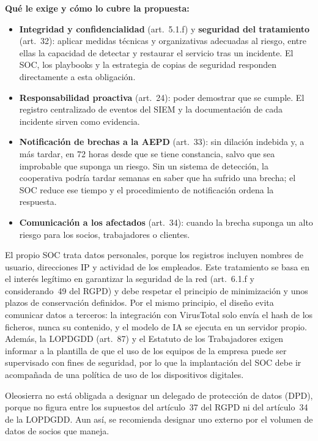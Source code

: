 \documentclass[11pt,a4paper,oneside]{report}
\begin{document}
\textbf{Qué le exige y cómo lo cubre la propuesta:}
\begin{itemize}
  \item \textbf{Integridad y confidencialidad} (art.~5.1.f) y \textbf{seguridad del tratamiento} (art.~32): aplicar medidas técnicas y organizativas adecuadas al riesgo, entre ellas la capacidad de detectar y restaurar el servicio tras un incidente. El SOC, los playbooks y la estrategia de copias de seguridad responden directamente a esta obligación.
  \item \textbf{Responsabilidad proactiva} (art.~24): poder demostrar que se cumple. El registro centralizado de eventos del SIEM y la documentación de cada incidente sirven como evidencia.
  \item \textbf{Notificación de brechas a la AEPD} (art.~33): sin dilación indebida y, a más tardar, en 72 horas desde que se tiene constancia, salvo que sea improbable que suponga un riesgo. Sin un sistema de detección, la cooperativa podría tardar semanas en saber que ha sufrido una brecha; el SOC reduce ese tiempo y el procedimiento de notificación ordena la respuesta.
  \item \textbf{Comunicación a los afectados} (art.~34): cuando la brecha suponga un alto riesgo para los socios, trabajadores o clientes.
\end{itemize}

El propio SOC trata datos personales, porque los registros incluyen nombres de usuario, direcciones IP y actividad de los empleados. Este tratamiento se basa en el interés legítimo en garantizar la seguridad de la red (art.~6.1.f y considerando~49 del RGPD) y debe respetar el principio de minimización y unos plazos de conservación definidos. Por el mismo principio, el diseño evita comunicar datos a terceros: la integración con VirusTotal solo envía el hash de los ficheros, nunca su contenido, y el modelo de IA se ejecuta en un servidor propio. Además, la LOPDGDD (art.~87) y el Estatuto de los Trabajadores exigen informar a la plantilla de que el uso de los equipos de la empresa puede ser supervisado con fines de seguridad, por lo que la implantación del SOC debe ir acompañada de una política de uso de los dispositivos digitales.

Oleosierra no está obligada a designar un delegado de protección de datos (DPD), porque no figura entre los supuestos del artículo~37 del RGPD ni del artículo~34 de la LOPDGDD. Aun así, se recomienda designar uno externo por el volumen de datos de socios que maneja.
\end{document}
